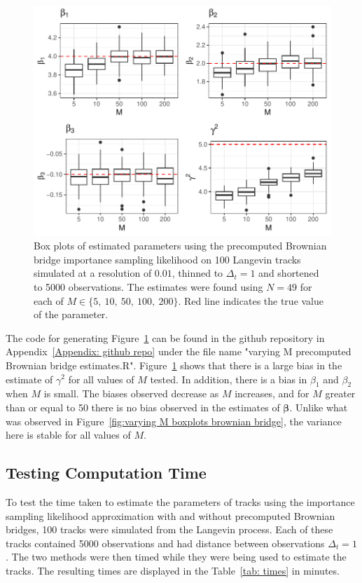 \begin{figure}[H]
    \centering
    \includegraphics[width=\linewidth]{Images/Results/varying M estimates boxplot precomputed BB.pdf}
    \caption[Box plots of Parameter Estimates using precomputed Brownian bridge importance sampling using different numbers of bridges]{Box plots of estimated parameters using the precomputed Brownian bridge importance sampling likelihood on 100 Langevin tracks simulated at a resolution of $0.01$, thinned to $\Delta_t = 1$ and shortened to 5000 observations. The estimates were found using $N=49$ for each of $M \in \{5 , \ 10, \ 50, \ 100, \ 200\}$. Red line indicates the true value of the parameter.}
    \label{fig:varying M boxplots precomputed brownian bridge}
\end{figure}

The code for generating Figure~\ref{fig:varying M boxplots precomputed brownian bridge} can be found in the github repository in Appendix~\ref{Appendix: github repo} under the file name "varying M precomputed Brownian bridge estimates.R". Figure~\ref{fig:varying M boxplots precomputed brownian bridge} shows that there is a large bias in the estimate of $\gamma^2$ for all values of $M$ tested. In addition, there is a bias in $\beta_1$ and $\beta_2$ when $M$ is small. The biases observed decrease as $M$ increases, and for $M$ greater than or equal to 50 there is no bias observed in the estimates of $\bm \beta$. Unlike what was observed in Figure~\ref{fig:varying M boxplots brownian bridge}, the variance here is stable for all values of $M$.


\subsection{Testing Computation Time}
\label{subsec: computation time}
To test the time taken to estimate the parameters of tracks using the importance sampling likelihood approximation with and without precomputed Brownian bridges, 100 tracks were simulated from the Langevin process. Each of these tracks contained 5000 observations and had distance between observations $\Delta_t = 1$. The two methods were then timed while they were being used to estimate the tracks. The resulting times are displayed in the Table~\ref{tab: times} in minutes.



